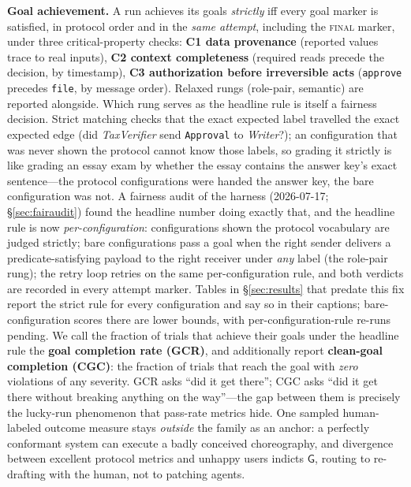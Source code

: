 \documentclass{article}
\newcommand{\gtG}{\mathsf{G}}
\begin{document}
\textbf{Goal achievement.} A run achieves its goals \emph{strictly} iff every goal marker is satisfied, in protocol order and in the \emph{same attempt}, including the \textsc{final} marker, under three critical-property checks: \textbf{C1 data provenance} (reported values trace to real inputs), \textbf{C2 context completeness} (required reads precede the decision, by timestamp), \textbf{C3 authorization before irreversible acts} (\texttt{approve} precedes \texttt{file}, by message order). Relaxed rungs (role-pair, semantic) are reported alongside. Which rung serves as the headline rule is itself a fairness decision. Strict matching checks that the exact expected label travelled the exact expected edge (did \textit{TaxVerifier} send \texttt{Approval} to \textit{Writer}?); an configuration that was never shown the protocol cannot know those labels, so grading it strictly is like grading an essay exam by whether the essay contains the answer key's exact sentence---the protocol configurations were handed the answer key, the bare configuration was not. A fairness audit of the harness (2026-07-17; \S\ref{sec:fairaudit}) found the headline number doing exactly that, and the headline rule is now \emph{per-configuration}: configurations shown the protocol vocabulary are judged strictly; bare configurations pass a goal when the right sender delivers a predicate-satisfying payload to the right receiver under \emph{any} label (the role-pair rung); the retry loop retries on the same per-configuration rule, and both verdicts are recorded in every attempt marker. Tables in \S\ref{sec:results} that predate this fix report the strict rule for every configuration and say so in their captions; bare-configuration scores there are lower bounds, with per-configuration-rule re-runs pending. We call the fraction of trials that achieve their goals under the headline rule the \textbf{goal completion rate (GCR)}, and additionally report \textbf{clean-goal completion (CGC)}: the fraction of trials that reach the goal with \emph{zero} violations of any severity. GCR asks ``did it get there''; CGC asks ``did it get there without breaking anything on the way''---the gap between them is precisely the lucky-run phenomenon that pass-rate metrics hide. One sampled human-labeled outcome measure stays \emph{outside} the family as an anchor: a perfectly conformant system can execute a badly conceived choreography, and divergence between excellent protocol metrics and unhappy users indicts $\gtG$, routing to re-drafting with the human, not to patching agents.
\end{document}
